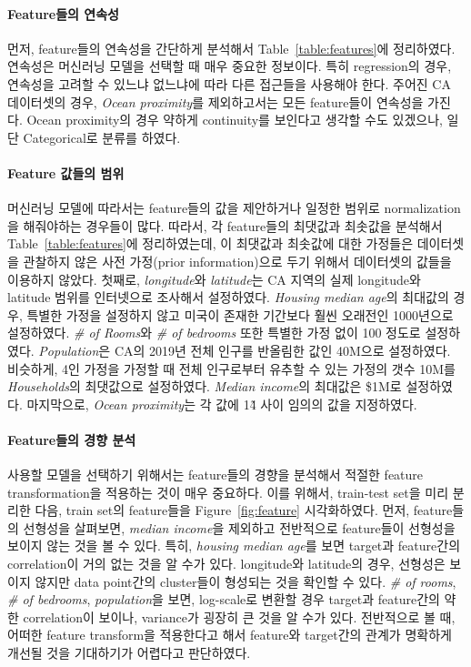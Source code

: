 \documentclass[ba]{imsart}
\begin{document}
\paragraph{Feature들의 연속성}
먼저, feature들의 연속성을 간단하게 분석해서 Table~\ref{table:features}에 정리하였다.
연속성은 머신러닝 모델을 선택할 때 매우 중요한 정보이다.
특히 regression의 경우, 연속성을 고려할 수 있느냐 없느냐에 따라 다른 접근들을 사용해야 한다.
주어진 CA 데이터셋의 경우, \textit{Ocean proximity}를 제외하고서는 모든 feature들이 연속성을 가진다.
Ocean proximity의 경우 약하게 continuity를 보인다고 생각할 수도 있겠으나, 일단 Categorical로 분류를 하였다.

\paragraph{Feature 값들의 범위}
머신러닝 모델에 따라서는 feature들의 값을 제안하거나 일정한 범위로 normalization을 해줘야하는 경우들이 많다.
따라서, 각 feature들의 최댓값과 최솟값을 분석해서 Table~\ref{table:features}에 정리하였는데, 이 최댓값과 최솟값에 대한 가정들은 데이터셋을 관찰하지 않은 사전 가정(prior information)으로 두기 위해서 데이터셋의 값들을 이용하지 않았다.
첫째로, \textit{longitude}와 \textit{latitude}는 CA 지역의 실제 longitude와 latitude 범위를 인터넷으로 조사해서 설정하였다.
\textit{Housing median age}의 최대값의 경우, 특별한 가정을 설정하지 않고 미국이 존재한 기간보다 훨씬 오래전인 1000년으로 설정하였다.
\textit{\# of Rooms}와 \textit{\# of bedrooms} 또한 특별한 가정 없이 100 정도로 설정하였다.
\textit{Population}은 CA의 2019년 전체 인구를 반올림한 값인 40M으로 설정하였다.
비슷하게, 4인 가정을 가정할 때 전체 인구로부터 유추할 수 있는 가정의 갯수 10M를 \textit{Households}의 최댓값으로 설정하였다.
\textit{Median income}의 최대값은 \$1M로 설정하였다.
마지막으로, \textit{Ocean proximity}는 각 값에 1\~4 사이 임의의 값을 지정하였다.

\paragraph{Feature들의 경향 분석}
사용할 모델을 선택하기 위해서는 feature들의 경향을 분석해서 적절한 feature transformation을 적용하는 것이 매우 중요하다.
이를 위해서, train-test set을 미리 분리한 다음, train set의 feature들을 Figure~\ref{fig:feature} 시각화하였다.
먼저, feature들의 선형성을 살펴보면, \textit{median income}을 제외하고 전반적으로 feature들이 선형성을 보이지 않는 것을 볼 수 있다.
특히, \textit{housing median age}를 보면 target과 feature간의 correlation이 거의 없는 것을 알 수가 있다.
longitude와 latitude의 경우, 선형성은 보이지 않지만 data point간의 cluster들이 형성되는 것을 확인할 수 있다.
\textit{\# of rooms}, \textit{\# of bedrooms}, \textit{population}을 보면, log-scale로 변환할 경우 target과 feature간의 약한 correlation이 보이나, variance가 굉장히 큰 것을 알 수가 있다.
전반적으로 볼 때, 어떠한 feature transform을 적용한다고 해서 feature와 target간의 관계가 명확하게 개선될 것을 기대하기가 어렵다고 판단하였다.
\end{document}
